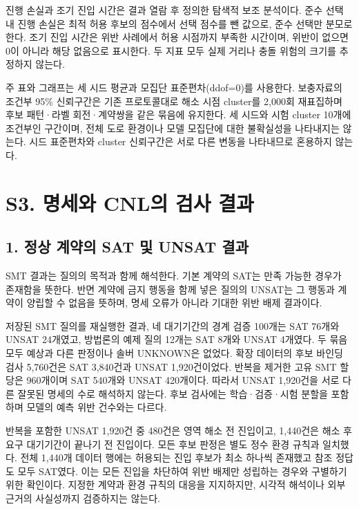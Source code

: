 \documentclass[11pt,a4paper]{article}
\begin{document}
진행 손실과 조기 진입 시간은 결과 열람 후 정의한 탐색적 보조 분석이다. 준수 선택 내 진행 손실은 최적 허용 후보의 점수에서 선택 점수를 뺀 값으로, 준수 선택만 분모로 한다. 조기 진입 시간은 위반 사례에서 허용 시점까지 부족한 시간이며, 위반이 없으면 0이 아니라 해당 없음으로 표시한다. 두 지표 모두 실제 거리나 충돌 위험의 크기를 추정하지 않는다.\par

주 표와 그래프는 세 시드 평균과 모집단 표준편차(ddof=0)를 사용한다. 보충자료의 조건부 95\% 신뢰구간은 기존 프로토콜대로 해소 시점 cluster를 2,000회 재표집하며 후보 패턴·라벨 회전·계약쌍을 같은 묶음에 유지한다. 세 시드와 시험 cluster 10개에 조건부인 구간이며, 전체 도로 환경이나 모델 모집단에 대한 불확실성을 나타내지는 않는다. 시드 표준편차와 cluster 신뢰구간은 서로 다른 변동을 나타내므로 혼용하지 않는다.\par

\section*{S3. 명세와 CNL의 검사 결과}

\subsection*{1. 정상 계약의 SAT 및 UNSAT 결과}

SMT 결과는 질의의 목적과 함께 해석한다. 기본 계약의 SAT는 만족 가능한 경우가 존재함을 뜻한다. 반면 계약에 금지 행동을 함께 넣은 질의의 UNSAT는 그 행동과 계약이 양립할 수 없음을 뜻하며, 명세 오류가 아니라 기대한 위반 배제 결과이다.\par

저장된 SMT 질의를 재실행한 결과, 네 대기기간의 경계 검증 100개는 SAT 76개와 UNSAT 24개였고, 방법론의 예제 질의 12개는 SAT 8개와 UNSAT 4개였다. 두 묶음 모두 예상과 다른 판정이나 솔버 UNKNOWN은 없었다. 확장 데이터의 후보 바인딩 검사 5,760건은 SAT 3,840건과 UNSAT 1,920건이었다. 반복을 제거한 고유 SMT 할당은 960개이며 SAT 540개와 UNSAT 420개이다. 따라서 UNSAT 1,920건을 서로 다른 잘못된 명세의 수로 해석하지 않는다. 후보 검사에는 학습·검증·시험 분할을 포함하며 모델의 예측 위반 건수와는 다르다.\par

반복을 포함한 UNSAT 1,920건 중 480건은 영역 해소 전 진입이고, 1,440건은 해소 후 요구 대기기간이 끝나기 전 진입이다. 모든 후보 판정은 별도 정수 환경 규칙과 일치했다. 전체 1,440개 데이터 행에는 허용되는 진입 후보가 최소 하나씩 존재했고 참조 정답도 모두 SAT였다. 이는 모든 진입을 차단하여 위반 배제만 성립하는 경우와 구별하기 위한 확인이다. 지정한 계약과 환경 규칙의 대응을 지지하지만, 시각적 해석이나 외부 근거의 사실성까지 검증하지는 않는다.\par
\end{document}
